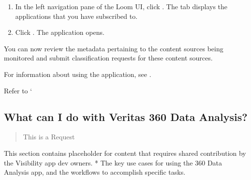 \documentclass[letterpaper,10pt,english]{sphinxmanual}
\begin{document}
\begin{enumerate}
\item {} 
In the left navigation pane of the Loom UI, click . The  tab displays the applications that you have subscribed to.

\end{enumerate}
\begin{quote}

\begin{figure}[htbp]
\centering

\noindent{}
\end{figure}
\end{quote}
\begin{enumerate}
\setcounter{enumi}{1}
\item {} 
Click . The application opens.

\end{enumerate}

You can now review the metadata pertaining to the content sources being monitored and submit classification requests for these content sources.

For information about using the application, see {\hyperref[\detokenize{mcdmp_app_ug:using-visibility}]{}}.

Refer to  ‘


\subsection{What can I do with Veritas 360 Data Analysis?}
\label{\detokenize{mcdmp_app_ug:what-can-i-do-with-veritas-360-data-analysis}}\begin{quote}




This is a  Request


\end{quote}

This section contains placeholder for content that requires shared contribution by the Visibility app dev owners.
*  The key use cases for using the 360 Data Analysis app, and the workflows to accomplish specific tasks.
\end{document}
